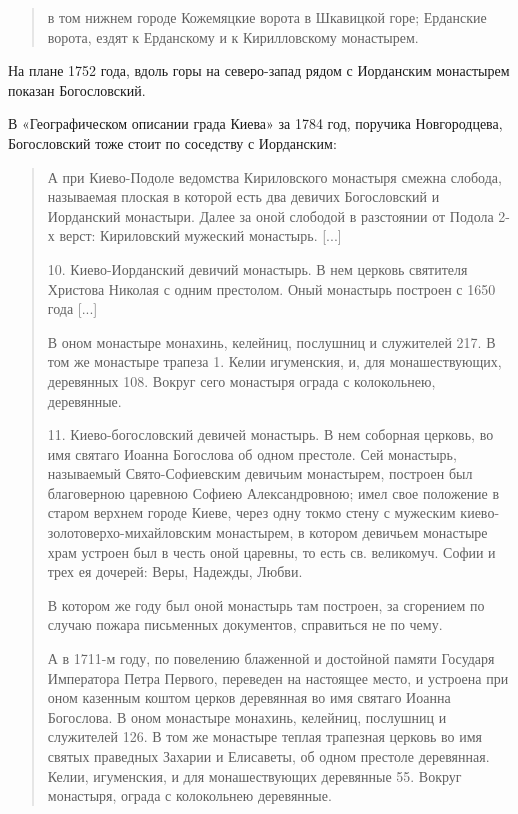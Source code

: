 \begin{quotation}
в том нижнем городе Кожемяцкие ворота в Шкавицкой горе; Ерданские ворота, ездят к Ерданскому и к Кирилловскому монастырем.
\end{quotation}

На плане 1752 года, вдоль горы на северо-запад рядом с Иорданским монастырем показан Богословский. 

В «Географическом описании града Киева» за 1784 год, поручика Новгородцева, Богословский тоже стоит по соседству с Иорданским: 

\begin{quotation}
А при Киево-Подоле ведомства Кириловского монастыря смежна слобода, называемая плоская в которой есть два девичих Богословский и Иорданский монастыри. Далее за оной слободой в разстоянии от Подола 2-х верст: Кириловский мужеский монастырь. [...]

10. Киево-Иорданский девичий монастырь. В нем церковь святителя Христова Николая с одним престолом. Оный монастырь построен с 1650 года [...] 

В оном монастыре монахинь, келейниц, послушниц и служителей 217. В том же монастыре трапеза 1. Келии игуменския, и, для монашествующих, деревянных 108. Вокруг сего монастыря ограда с колокольнею, деревянные.

11. Киево-богословский девичей монастырь. В нем соборная церковь, во имя святаго Иоанна Богослова об одном престоле. Сей монастырь, называемый Свято-Софиевским девичьим монастырем, построен был благоверною царевною Софиею Александровною; имел свое положение в старом верхнем городе Киеве, через одну токмо стену с мужеским киево-золото\-верхо-михайловским монастырем, в котором девичьем монастыре храм устроен был в честь оной царевны, то есть св. великомуч. Софии и трех ея дочерей: Веры, Надежды, Любви. 

В котором же году был оной монастырь там построен, за сгорением по случаю пожара письменных документов, справиться не по чему. 

А в 1711-м году, по повелению блаженной и достойной памяти Государя Императора Петра Первого, переведен на настоящее место, и устроена при оном казенным коштом церков деревянная во имя святаго Иоанна Богослова. В оном монастыре монахинь, келейниц, послушниц и служителей 126. В том же монастыре теплая трапезная церковь во имя святых праведных Захарии и Елисаветы, об одном престоле деревянная. Келии, игуменския, и для монашествующих деревянные 55. Вокруг монастыря, ограда с колокольнею деревянные.
\end{quotation}

